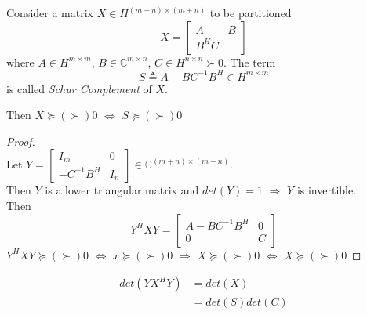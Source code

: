 \begin{multicols}{2}
\begin{definition} 
    Consider a matrix $X\in H^{(m+n)\times (m+n)}$ to be partitioned 
    \[
        X = \begin{bmatrix}
            A & B \\ B^H C
        \end{bmatrix}
    \]
    where $A\in H^{m\times m}$, $B\in \mathbb{C}^{m\times n}$, $C\in H^{n\times n}\succ 0$. The term 
    \[
        S\triangleq A - BC^{-1}B^H \in H^{m\times m}
    \]
    is called \emph{Schur Complement} of $X$.\\
\end{definition}

Then $X\succeq (\succ) 0$ $\Longleftrightarrow$ $S\succeq (\succ) 0$
\begin{proof} \\
Let $Y=\begin{bmatrix}
    I_m & 0 \\ -C^{-1}B^H & I_n
\end{bmatrix} \in \mathbb{C}^{(m+n)\times (m+n)}$. \\
Then $Y$ is a lower triangular matrix and $det(Y)=1$ $\Longrightarrow$ $Y$ is invertible.\\
Then
\[
    Y^HXY =\begin{bmatrix}
        A - BC^{-1}B^H & 0 \\ 0 & C
    \end{bmatrix}
\]  
$Y^HXY \succeq (\succ) 0$ $\Longleftrightarrow$ $x\succeq (\succ) 0$ $\Longrightarrow$ $X\succeq(\succ) 0$ $\Longleftrightarrow$ $X\succeq(\succ) 0$
\end{proof}

\[
    \begin{array}{ll}
        det(YX^HY) &= det(X) \\
        &= det(S)det(C)
    \end{array}
\]

\newpage
\end{multicols}